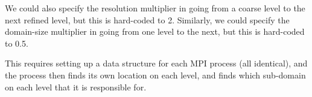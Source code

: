 \documentclass[a4paper,11pt]{article}
\begin{document}
We could also specify the resolution multiplier in going from a coarse level to the next refined level, but this is hard-coded to 2.
Similarly, we could specify the domain-size multiplier in going from one level to the next, but this is hard-coded to 0.5.

This requires setting up a data structure for each MPI process (all identical), and the process then finds its own location on each level, and finds which sub-domain on each level that it is responsible for.




\end{document}
